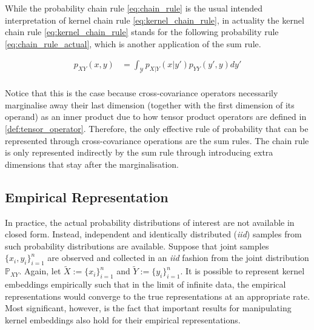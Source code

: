 \documentclass[twoside]{article} \usepackage{aistats2017}
\theoremstyle{definition}
\newtheorem{theorem}{Theorem}[section]
\newcommand{\rv}[1]{{#1}}
\newcommand{\ds}[1]{\tilde{#1}}
\begin{document}
		While the probability chain rule \eqref{eq:chain_rule} is the usual intended interpretation of kernel chain rule \eqref{eq:kernel_chain_rule}, in actuality the kernel chain rule \eqref{eq:kernel_chain_rule} stands for the following probability rule \eqref{eq:chain_rule_actual}, which is another application of the sum rule.

		\begin{equation}
		\begin{aligned}
			p_{\rv{X} \rv{Y}}(x, y) &= \int_{\mathcal{Y}} p_{\rv{X} | \rv{Y}}(x | y') p_{\rv{Y} \rv{Y}}(y', y) dy' \\
		\label{eq:chain_rule_actual}
		\end{aligned}
		\end{equation}	
					
		Notice that this is the case because cross-covariance operators necessarily marginalise away their last dimension (together with the first dimension of its operand) as an inner product due to how tensor product operators are defined in \cref{def:tensor_operator}. Therefore, the only effective rule of probability that can be represented through cross-covariance operations are the sum rules. The chain rule is only represented indirectly by the sum rule through introducing extra dimensions that stay after the marginalisation.

%			
	\subsection{Empirical Representation}
	\label{sec:kernel_embeddings:empirical_representation}
	
		In practice, the actual probability distributions of interest are not available in closed form. Instead, independent and identically distributed (\textit{iid}) samples from such probability distributions are available. Suppose that joint samples $\{x_{i}, y_{i}\}_{i = 1}^{n}$ are observed and collected in an \textit{iid} fashion from the joint distribution $\mathbb{P}_{\rv{X} \rv{Y}}$. Again, let $\ds{X} := \{x_{i}\}_{i = 1}^{n}$ and $\ds{Y} := \{y_{i}\}_{i = 1}^{n}$. It is possible to represent kernel embeddings empirically such that in the limit of infinite data, the empirical representations would converge to the true representations at an appropriate rate. Most significant, however, is the fact that important results for manipulating kernel embeddings also hold for their empirical representations.
\end{document}
